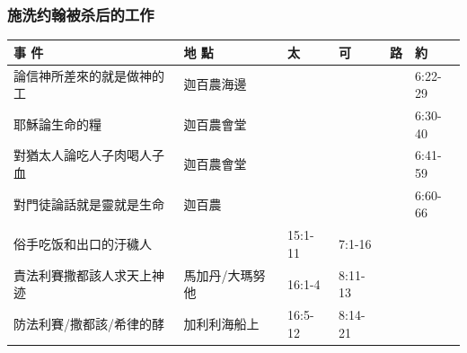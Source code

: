 \subsubsection{施洗约翰被杀后的工作}
\begin{table}[H]\centering 
\begin{tabular}{p{13.07em}|p{8.43em}|p{5.285em}|p{5.57em}|p{5.285em}|p{4.855em}}
\toprule
\textbf{事 件} & \textbf{地 點} & \textbf{太} & \textbf{可} & \textbf{路} & \textbf{約} \\\midrule

論信神所差來的就是做神的工& 迦百農海邊& \multicolumn{1}{r|}{} & \multicolumn{1}{r|}{} &       & \multicolumn{1}{p{4.855em}}{6:22-29} \\\midrule
耶穌論生命的糧 & 迦百農會堂   & \multicolumn{1}{r|}{} & \multicolumn{1}{r|}{} &       & \multicolumn{1}{p{4.855em}}{6:30-40} \\\midrule
對猶太人論吃人子肉喝人子血& 迦百農會堂   & \multicolumn{1}{r|}{} & \multicolumn{1}{r|}{} &       & \multicolumn{1}{p{4.855em}}{6:41-59} \\\midrule

對門徒論話就是靈就是生命& 迦百農& \multicolumn{1}{r|}{} & \multicolumn{1}{r|}{} &       & \multicolumn{1}{p{4.855em}}{6:60-66} \\\midrule

俗手吃饭和出口的汙穢人&  & 15:1-11& 7:1-16&       &  \\\midrule



責法利賽撒都該人求天上神迹& \multicolumn{1}{p{7.93em}|}{馬加丹/大瑪努他} & \multicolumn{1}{p{5.285em}|}{16:1-4} & \multicolumn{1}{p{5.57em}|}{8:11-13} & \multicolumn{1}{r|}{} &  \\ \midrule

防法利賽/撒都該/希律的酵& \multicolumn{1}{p{7.93em}|}{加利利海船上} & \multicolumn{1}{p{5.285em}|}{16:5-12} & \multicolumn{1}{p{5.57em}|}{8:14-21} & \multicolumn{1}{r|}{} &  \\ \midrule

\end{tabular}%
\end{table}%



